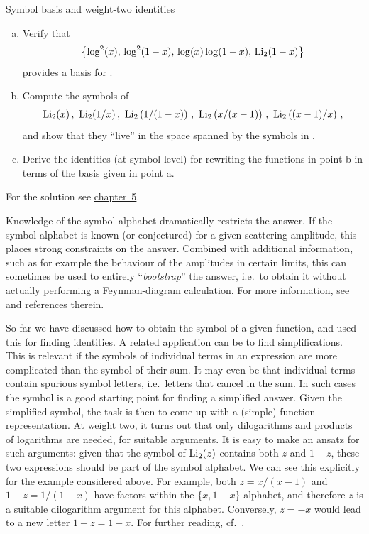 \begin{exer}{Symbol basis and weight-two identities}
\label{Ex:4.W2basis}
%
\vspace{-0.6cm}
\begin{enumerate}[a)]
\item Verify that 
\begin{align} \label{eq:funcbasisW2}
\bigl\{ \log^2(x), \, \log^2 (1-x), \, \log(x) \log (1-x), \, {\rm Li}_{2}(1-x)\bigr\}
\end{align}
provides a basis for .
\smallskip
\item Compute the symbols of 
\begin{align} \label{eq:dilogs}
{\rm Li}_{2}(x) \,, \  {\rm Li}_{2}(1/x) \,, \  {\rm Li}_{2}\left(1/(1-x)\right) \,, \  {\rm Li}_{2}\left(x/(x-1)\right) \,, \ {\rm Li}_{2}\left((x-1)/x\right)  \,, 
\end{align}
and show that they ``live'' in the space spanned by the symbols in .  
\smallskip
\item Derive the identities (at symbol level) for rewriting the functions in point b in terms of the basis given in point a.
\end{enumerate}
For the solution see \hyperref[Sol:4.W2basis]{chapter~5}.
\end{exer}

\begin{important}{Knowledge of the symbol alphabet dramatically restricts the answer.}
If the symbol alphabet is known (or conjectured) for a given scattering amplitude, this places strong constraints on the answer. 
Combined with additional information, such as for example the behaviour of the amplitudes in certain limits, this can sometimes be used to entirely ``\emph{bootstrap}'' the answer, i.e.\ to obtain it without actually performing a Feynman-diagram calculation.
For more information, see~\cite{ch4Henn:2020omi} and references therein. 
\end{important}

So far we have discussed how to obtain the symbol of a given function, and used this for finding identities.
A related application can be to find simplifications. This is relevant if the symbols of individual terms in an expression are more complicated than the symbol of their sum. It may even be that individual terms contain spurious symbol letters, i.e.\ letters that cancel in the sum. In such cases the symbol is a good starting point for finding a simplified answer.
Given the simplified symbol, the task is then to come up with a (simple) function representation.
At weight two, it turns out that only dilogarithms and products of logarithms are needed, for suitable arguments. 
It is easy to make an ansatz for such arguments: given that the symbol of ${\rm Li}_{2}(z)$ contains both $z$ and $1-z$, these two expressions should be part of the symbol alphabet. We can see this explicitly for the example considered above. For example, both $z=x/(x-1)$ and $1-z = 1/(1-x)$ have factors within the $\{x,1-x\}$ alphabet, and therefore $z$ is a suitable dilogarithm argument for this alphabet. Conversely, $z=-x$ would lead to a new letter $1-z=1+x$. For further reading, 
cf.~\cite{ch4Goncharov:2010jf}.

